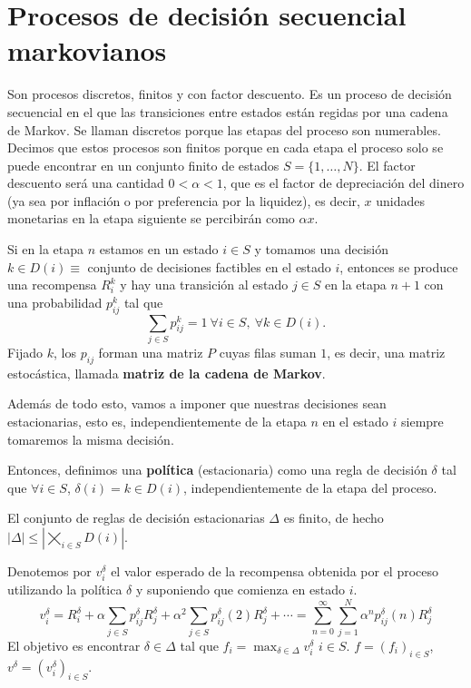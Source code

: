 \documentclass[MIOP.tex]{subfiles}
\begin{document}
\section{Procesos de decisión secuencial markovianos}
Son procesos discretos, finitos y con factor descuento. Es un proceso de decisión secuencial en el que las transiciones entre estados están regidas por una cadena de Markov. Se llaman discretos porque las etapas del proceso son numerables. Decimos que estos procesos son finitos porque en cada etapa el proceso solo se puede encontrar en un conjunto finito de estados $S=\{1,\dots, N\}$. El factor descuento será una cantidad $0<\alpha <1$, que es el factor de depreciación del dinero (ya sea por inflación o por preferencia por la liquidez), es decir, $x$ unidades monetarias en la etapa siguiente se percibirán como $\alpha x$. 

Si en la etapa $n$ estamos en un estado $i\in S$ y tomamos una decisión $k\in D(i)\equiv$ conjunto de decisiones factibles en el estado $i$, entonces se produce una recompensa $R^k_i$ y hay una transición al estado $j\in S$ en la etapa $n+1$ con una probabilidad $p_{ij}^k$ tal que 
$$\sum_{j\in S}p_{ij}^k=1\ \forall i\in S,\ \forall k\in D(i).$$
Fijado $k$, los $p_{ij}$ forman una matriz $P$ cuyas filas suman $1$, es decir, una matriz estocástica, llamada \textbf{matriz de la cadena de Markov}.

Además de todo esto, vamos a imponer que nuestras decisiones sean estacionarias, esto es, independientemente de la etapa $n$ en el estado $i$ siempre tomaremos la misma decisión. 

Entonces, definimos una \textbf{política} (estacionaria) como una regla de decisión $\delta$ tal que $\forall i\in S$, $\delta(i)=k\in D(i)$, independientemente de la etapa del proceso.

El conjunto de reglas de decisión estacionarias $\Delta$ es finito, de hecho $|\Delta|\leq |\bigtimes_{i\in S} D(i)|$.  

Denotemos por $v^\delta_i$ el valor esperado de la recompensa obtenida por el proceso utilizando la política $\delta$ y suponiendo que comienza en estado $i$. 
$$v^\delta_i=R^\delta_i+\alpha\sum_{j\in S} p_{ij}^\delta R_j^\delta +\alpha^2\sum_{j\in S}p_{ij}^\delta(2)R_j^\delta+\cdots=\sum_{n=0}^\infty\sum_{j=1}^N\alpha^n p_{ij}^\delta(n) R_j^\delta$$
El objetivo es encontrar $\delta\in\Delta$ tal que $f_i=\max_{\delta\in\Delta}v_i^\delta$ $i\in S$. $f=(f_i)_{i\in S}$, $v^\delta=(v_i^\delta)_{i\in S}$.
\end{document}

